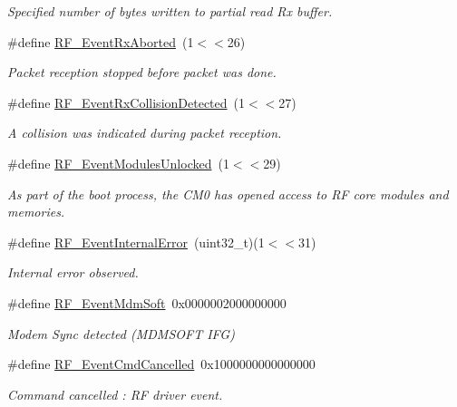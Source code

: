 \begin{DoxyCompactItemize}
\begin{DoxyCompactList}\small\item\em Specified number of bytes written to partial read Rx buffer. \end{DoxyCompactList}\item 
\#define \hyperlink{group___r_f___core___events_gaf2db331d93e28cdafc4367497a2f6f89}{R\+F\+\_\+\+Event\+Rx\+Aborted}~(1$<$$<$26)
\begin{DoxyCompactList}\small\item\em Packet reception stopped before packet was done. \end{DoxyCompactList}\item 
\#define \hyperlink{group___r_f___core___events_gaaba4e22e27b9ac26244b02c7cfd657d0}{R\+F\+\_\+\+Event\+Rx\+Collision\+Detected}~(1$<$$<$27)
\begin{DoxyCompactList}\small\item\em A collision was indicated during packet reception. \end{DoxyCompactList}\item 
\#define \hyperlink{group___r_f___core___events_gae5cb277f5a7a23bf1d7e6405f3e2253e}{R\+F\+\_\+\+Event\+Modules\+Unlocked}~(1$<$$<$29)
\begin{DoxyCompactList}\small\item\em As part of the boot process, the C\+M0 has opened access to R\+F core modules and memories. \end{DoxyCompactList}\item 
\#define \hyperlink{group___r_f___core___events_gaf872a5a1a47d7401499d7826eea8da98}{R\+F\+\_\+\+Event\+Internal\+Error}~(uint32\+\_\+t)(1$<$$<$31)
\begin{DoxyCompactList}\small\item\em Internal error observed. \end{DoxyCompactList}\item 
\#define \hyperlink{group___r_f___core___events_ga83edee28803f1b2addc0f8458d0cc657}{R\+F\+\_\+\+Event\+Mdm\+Soft}~0x0000002000000000
\begin{DoxyCompactList}\small\item\em Modem Sync detected (M\+D\+M\+S\+O\+F\+T I\+F\+G) \end{DoxyCompactList}\item 
\#define \hyperlink{group___r_f___driver___events_gae6d21f9806a7482a0f324f98bb83aac0}{R\+F\+\_\+\+Event\+Cmd\+Cancelled}~0x1000000000000000
\begin{DoxyCompactList}\small\item\em Command cancelled \+: R\+F driver event. \end{DoxyCompactList}\item 

\end{DoxyCompactItemize}
